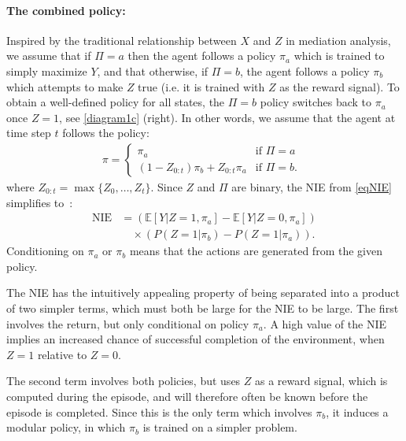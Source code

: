 \documentclass[letterpaper]{article} %
\newcommand{\EE}{\mathbb{E}}
\newcommand{\NIE}{\textrm{NIE}\xspace}
\begin{document}
	\paragraph{The combined policy:}
	Inspired by the traditional relationship between $X$ and $Z$ in mediation analysis, we assume that if $\Pi = a$ then the agent follows a policy $\pi_a$ which is trained to simply maximize $Y$, and that otherwise, if $\Pi = b$, the agent follows a policy $\pi_b$ which attempts to make $Z$ true (i.e. it is trained with $Z$ as the reward signal). To obtain a well-defined policy for all states, the $\Pi=b$ policy switches back to $\pi_a$ once $Z=1$, see \cref{diagram1c} (right). In other words, we assume that the agent at time step $t$ follows the policy:
	\begin{align}
		\pi = \begin{cases} \pi_a & \mbox{if $\Pi = a$ } \\ \left(1-Z_{0:t} \right)\pi_b +Z_{0:t} \pi_a
			& \mbox{if $\Pi = b$. }\end{cases} \label{eq10}
	\end{align}
	where $Z_{0:t} = \max\{Z_0,\dots,Z_t\}$.
	Since $Z$ and $\Pi$ are binary, the \NIE from \cref{eqNIE} simplifies to~\cite{pearl2001direct}:
	\begin{align}
		\NIE & = \left( \EE\left[Y | Z=1, \pi_a \right] - \EE\left[Y | Z=0, \pi_a \right] \right) \nonumber \\
		&\quad  \times  \left( P(Z=1| \pi_b) -P(Z=1| \pi_a) \right).\label{eq12}
	\end{align}
	Conditioning on $\pi_a$ or $\pi_b$ means that the actions are generated from the given policy. 
	
	The \NIE has the intuitively appealing property of being separated into a product of two simpler terms, which must both be large for the \NIE to be large. The first involves the return, but only conditional on policy $\pi_a$. A high value of the \NIE implies an increased chance of successful completion of the environment, when $Z=1$ relative to $Z=0$. 
	
	The second term involves both policies, but uses $Z$ as a reward signal, which is computed during the episode, and will therefore often be known before the episode is completed. Since this is the only term which involves $\pi_b$, it induces a modular policy, in which $\pi_b$ is trained on a simpler problem.%
	
\end{document}
